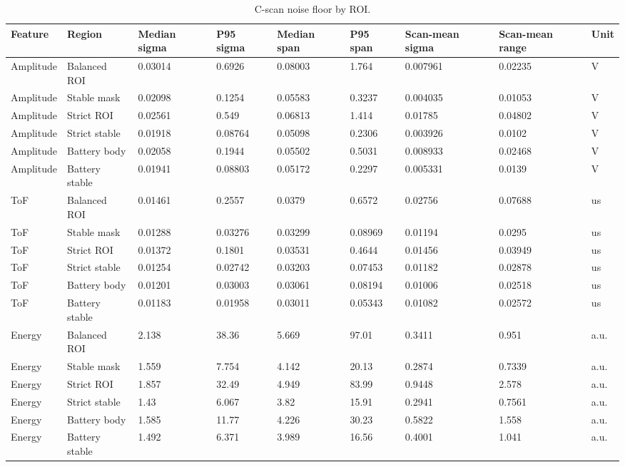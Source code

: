 \begin{table}[htbp]
\centering
\caption{C-scan noise floor by ROI.}
\label{tab:cscan_noise_floor_roi}
\begin{tabular}{lllllllll}
\hline
Feature & Region & Median sigma & P95 sigma & Median span & P95 span & Scan-mean sigma & Scan-mean range & Unit \\
\hline
Amplitude & Balanced ROI & 0.03014 & 0.6926 & 0.08003 & 1.764 & 0.007961 & 0.02235 & V \\
Amplitude & Stable mask & 0.02098 & 0.1254 & 0.05583 & 0.3237 & 0.004035 & 0.01053 & V \\
Amplitude & Strict ROI & 0.02561 & 0.549 & 0.06813 & 1.414 & 0.01785 & 0.04802 & V \\
Amplitude & Strict stable & 0.01918 & 0.08764 & 0.05098 & 0.2306 & 0.003926 & 0.0102 & V \\
Amplitude & Battery body & 0.02058 & 0.1944 & 0.05502 & 0.5031 & 0.008933 & 0.02468 & V \\
Amplitude & Battery stable & 0.01941 & 0.08803 & 0.05172 & 0.2297 & 0.005331 & 0.0139 & V \\
ToF & Balanced ROI & 0.01461 & 0.2557 & 0.0379 & 0.6572 & 0.02756 & 0.07688 & us \\
ToF & Stable mask & 0.01288 & 0.03276 & 0.03299 & 0.08969 & 0.01194 & 0.0295 & us \\
ToF & Strict ROI & 0.01372 & 0.1801 & 0.03531 & 0.4644 & 0.01456 & 0.03949 & us \\
ToF & Strict stable & 0.01254 & 0.02742 & 0.03203 & 0.07453 & 0.01182 & 0.02878 & us \\
ToF & Battery body & 0.01201 & 0.03003 & 0.03061 & 0.08194 & 0.01006 & 0.02518 & us \\
ToF & Battery stable & 0.01183 & 0.01958 & 0.03011 & 0.05343 & 0.01082 & 0.02572 & us \\
Energy & Balanced ROI & 2.138 & 38.36 & 5.669 & 97.01 & 0.3411 & 0.951 & a.u. \\
Energy & Stable mask & 1.559 & 7.754 & 4.142 & 20.13 & 0.2874 & 0.7339 & a.u. \\
Energy & Strict ROI & 1.857 & 32.49 & 4.949 & 83.99 & 0.9448 & 2.578 & a.u. \\
Energy & Strict stable & 1.43 & 6.067 & 3.82 & 15.91 & 0.2941 & 0.7561 & a.u. \\
Energy & Battery body & 1.585 & 11.77 & 4.226 & 30.23 & 0.5822 & 1.558 & a.u. \\
Energy & Battery stable & 1.492 & 6.371 & 3.989 & 16.56 & 0.4001 & 1.041 & a.u. \\
\hline
\end{tabular}
\end{table}
